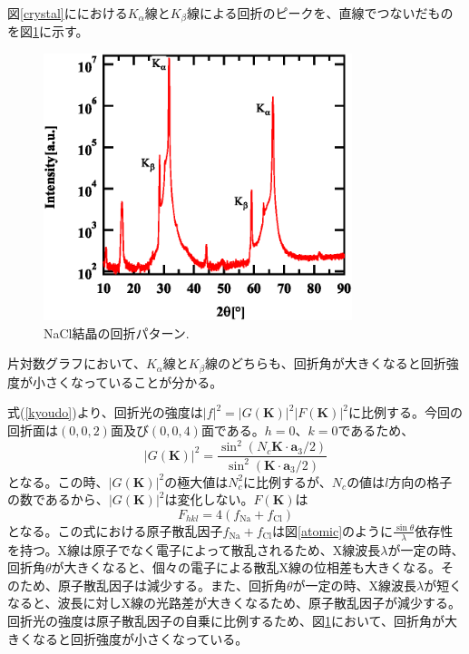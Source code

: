 \documentclass[11pt,a4j,uplatex]{jsarticle}
\begin{document}
図\ref{crystal}ににおける$K_\alpha$線と$K_\beta$線による回折のピークを、直線でつないだものを図\ref{kakb}に示す。

 \begin{figure}[htb]
  \centering
  \includegraphics[clip,width=9cm]{kakb.eps}
  \caption{NaCl結晶の回折パターン.}
  \label{kakb}
 \end{figure}

片対数グラフにおいて、$K_\alpha$線と$K_\beta$線のどちらも、回折角が大きくなると回折強度が小さくなっていることが分かる。

\newpage
式(\ref{kyoudo})より、回折光の強度は${|f|}^2={|G\bm{(K)}|^2}{|F\bm{(K)}|^2}$に比例する。今回の回折面は$(0,0,2)$面及び$(0,0,4)$面である。$h=0、k=0$であるため、
\begin{equation}
  |G(\bm{K})|^2=\frac{\sin^2(N_c\bm{K}\cdot\bm{a}_3/2)}{\sin^2(\bm{K}\cdot\bm{a}_3/2)}
\end{equation}
となる。この時、$|G(\bm{K})|^2$の極大値は$N_c^2$に比例するが、$N_c$の値は$l$方向の格子の数であるから、$|G(\bm{K})|^2$は変化しない。$F(\bm{K})$は
\begin{equation}
  F_{hkl}=4(f_{\mathrm{Na}}+f_{\mathrm{Cl}})
\end{equation}
となる。この式における原子散乱因子$f_{\mathrm{Na}}+f_{\mathrm{Cl}}$は図\ref{atomic}のように$\frac{\sin\theta}{\lambda}$依存性を持つ\cite{atom}。X線は原子でなく電子によって散乱されるため、X線波長$\lambda$が一定の時、回折角$\theta$が大きくなると、個々の電子による散乱X線の位相差も大きくなる。そのため、原子散乱因子は減少する。また、回折角$\theta$が一定の時、X線波長$\lambda$が短くなると、波長に対しX線の光路差が大きくなるため、原子散乱因子が減少する。回折光の強度は原子散乱因子の自乗に比例するため、図\ref{kakb}において、回折角が大きくなると回折強度が小さくなっている。
\end{document}
